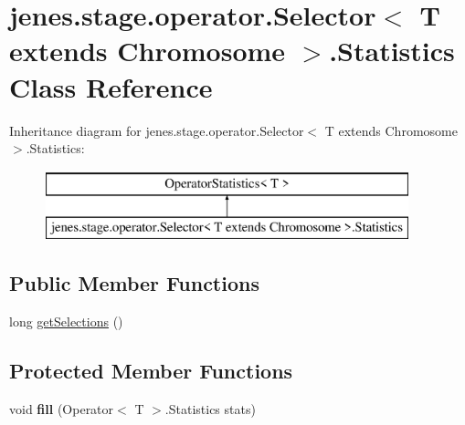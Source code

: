 \hypertarget{classjenes_1_1stage_1_1operator_1_1_selector_3_01_t_01extends_01_chromosome_01_4_1_1_statistics}{\section{jenes.\-stage.\-operator.\-Selector$<$ T extends Chromosome $>$.Statistics Class Reference}
\label{classjenes_1_1stage_1_1operator_1_1_selector_3_01_t_01extends_01_chromosome_01_4_1_1_statistics}
}
Inheritance diagram for jenes.\-stage.\-operator.\-Selector$<$ T extends Chromosome $>$.Statistics\-:\begin{figure}[H]
\begin{center}
\leavevmode
\includegraphics[height=2.000000cm]{classjenes_1_1stage_1_1operator_1_1_selector_3_01_t_01extends_01_chromosome_01_4_1_1_statistics}
\end{center}
\end{figure}
\subsection*{Public Member Functions}
\begin{DoxyCompactItemize}
\item 
long \hyperlink{classjenes_1_1stage_1_1operator_1_1_selector_3_01_t_01extends_01_chromosome_01_4_1_1_statistics_a0145f6cec84ff007289d206f579a117a}{get\-Selections} ()
\end{DoxyCompactItemize}
\subsection*{Protected Member Functions}
\begin{DoxyCompactItemize}
\item 
\hypertarget{classjenes_1_1stage_1_1operator_1_1_selector_3_01_t_01extends_01_chromosome_01_4_1_1_statistics_ab1db0e72568009d65141927f039ffe84}{void {\bfseries fill} (Operator$<$ T $>$.Statistics stats)}\label{classjenes_1_1stage_1_1operator_1_1_selector_3_01_t_01extends_01_chromosome_01_4_1_1_statistics_ab1db0e72568009d65141927f039ffe84}

\end{DoxyCompactItemize}
